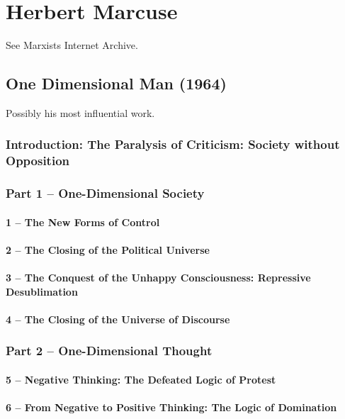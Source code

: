 \documentclass[10pt,titlepage]{book}
\begin{document}
\section{Herbert Marcuse}

See Marxists Internet Archive\cite{marcuse-mia}.

\subsection{One Dimensional Man (1964) \cite{marcuse-one-dim}}

Possibly his most influential work.

\subsubsection{Introduction: The Paralysis of Criticism: Society without Opposition}
\subsubsection{Part 1 – One-Dimensional Society}
\paragraph{1 – The New Forms of Control}
\paragraph{2 – The Closing of the Political Universe}
\paragraph{3 – The Conquest of the Unhappy Consciousness: Repressive Desublimation}
\paragraph{4 – The Closing of the Universe of Discourse}
\subsubsection{Part 2 – One-Dimensional Thought}
\paragraph{5 – Negative Thinking: The Defeated Logic of Protest}
\paragraph{6 – From Negative to Positive Thinking: The Logic of Domination}
\end{document}
